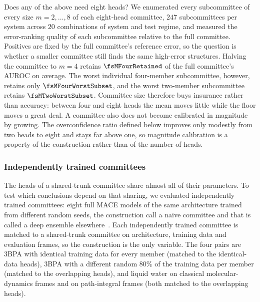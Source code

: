 Does any of the above need eight heads? We enumerated every subcommittee of
every size $m=2,\dots,8$ of each eight-head committee, $247$ subcommittees per
system across $20$ combinations of system and test regime, and measured the
error-ranking quality of each subcommittee relative to the full committee.
Positives are fixed by the full committee's reference error, so the question is
whether a smaller committee still finds the same high-error structures.
Halving the committee to $m=4$ retains $\fsMFourRetained$ of the full
committee's AUROC on average. The worst individual four-member subcommittee,
however, retains only $\fsMFourWorstSubset$, and the worst two-member
subcommittee retains $\fsMTwoWorstSubset$. Committee size therefore buys
insurance rather than accuracy: between four and eight heads the mean moves
little while the floor moves a great deal. A committee also does not become
calibrated in magnitude by growing. The overconfidence ratio defined below
improves only modestly from two heads to eight and stays far above one, so
magnitude calibration is a property of the construction rather than of the
number of heads.

\subsubsection{Independently trained committees}

The heads of a shared-trunk committee share almost all of their parameters. To
test which conclusions depend on that sharing, we evaluated independently
trained committees: eight full MACE models of the same architecture trained
from different random seeds, the construction \citet{beck2025committee} call a
naive committee and that is called a deep ensemble
elsewhere~\citep{lakshminarayanan2017simple}. Each independently trained
committee is matched to a shared-trunk committee on architecture, training data
and evaluation frames, so the construction is the only variable. The four pairs
are 3BPA with identical training data for every member (matched to the
identical-data heads), 3BPA with a different random 80\% of the training data
per member (matched to the overlapping heads), and liquid water on classical
molecular-dynamics frames and on path-integral frames (both matched to the
overlapping heads).

